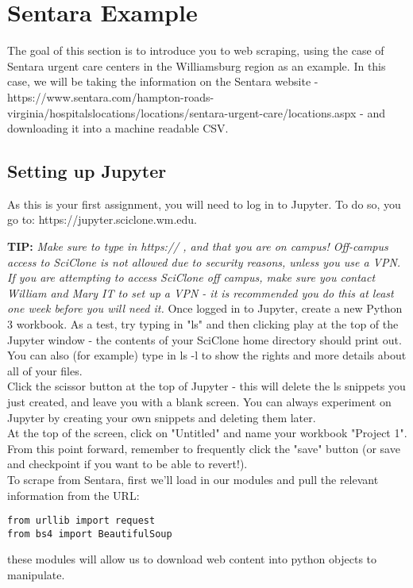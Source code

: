 \documentclass[a4paper, 11pt]{article}
\begin{document}
\section{Sentara Example}
The goal of this section is to introduce you to web scraping, using the case of Sentara urgent care centers in the Williamsburg region as an example.  In this case, we will be taking the information on the Sentara website - https://www.sentara.com/hampton-roads-virginia/hospitalslocations/locations/sentara-urgent-care/locations.aspx - and downloading it into a machine readable CSV.  

\subsection{Setting up Jupyter}
As this is your first assignment, you will need to log in to Jupyter.  To do so, you go to: https://jupyter.sciclone.wm.edu.\\\vspace{0.1in}

\textbf{TIP:} \textit{Make sure to type in https:// , and that you are on campus!  Off-campus access to SciClone is not allowed due to security reasons, unless you use a VPN. If you are attempting to access SciClone off campus, make sure you contact William and Mary IT to set up a VPN - it is recommended you do this at least one week before you will need it.}
\vspace{0.1in}
Once logged in to Jupyter, create a new Python 3 workbook. As a test, try typing in "ls" and then clicking play at the top of the Jupyter window - the contents of your SciClone home directory should print out.  You can also (for example) type in ls -l to show the rights and more details about all of your files.\\
Click the scissor button at the top of Jupyter - this will delete the ls snippets you just created, and leave you with a blank screen.  You can always experiment on Jupyter by creating your own snippets and deleting them later.\\
At the top of the screen, click on "Untitled" and name your workbook "Project 1".  From this point forward, remember to frequently click the "save" button (or save and checkpoint if you want to be able to revert!).\\

To scrape from Sentara, first we'll load in our modules and pull the relevant information from the URL:
\begin{lstlisting}
from urllib import request
from bs4 import BeautifulSoup
\end{lstlisting}
these modules will allow us to download web content into python objects to manipulate.
\end{document}

